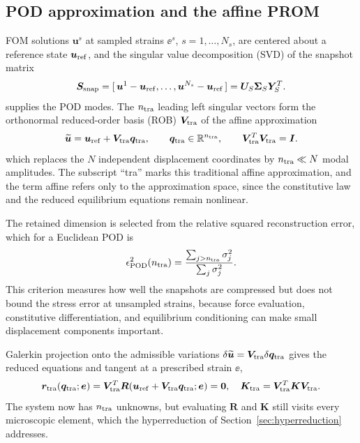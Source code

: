 \subsection{POD approximation and the affine PROM}
FOM solutions $\bm u^s$ at sampled strains $\ee^s$, $s=1,\ldots,N_s$, are centered about a reference state $\bm u_{\rm ref}$, and the singular value decomposition (SVD) of the snapshot matrix
\begin{equation}
 \bm S_{\rm snap}=
 [\,\bm u^1-\bm u_{\rm ref},\ldots,\bm u^{N_s}-\bm u_{\rm ref}\,]
 =\bm U_S\bm\Sigma_S\bm Y_S^T.
 \label{eq:snapshot_svd}
\end{equation}
supplies the POD modes. The $n_{\rm tra}$ leading left singular vectors form the orthonormal reduced-order basis (ROB) $\bm V_{\rm tra}$ of the affine approximation
\begin{equation}
 \widetilde{\bm u}=\bm u_{\rm ref}+\bm V_{\rm tra}\bm q_{\rm tra},
 \qquad \bm q_{\rm tra}\in\mathbb R^{n_{\rm tra}},
 \qquad \bm V_{\rm tra}^T\bm V_{\rm tra}=\bm I.
 \label{eq:linear_prom}
\end{equation}
which replaces the $N$ independent displacement coordinates by $n_{\rm tra}\ll N$ modal amplitudes. The subscript ``tra'' marks this traditional affine approximation, and the term affine refers only to the approximation space, since the constitutive law and the reduced equilibrium equations remain nonlinear.

The retained dimension is selected from the relative squared reconstruction error, which for a Euclidean POD is
\begin{equation}
 \epsilon_{\rm POD}^2(n_{\rm tra})=
 \frac{\sum_{j>n_{\rm tra}}\sigma_j^2}{\sum_j\sigma_j^2}.
 \label{eq:pod_tail}
\end{equation}
This criterion measures how well the snapshots are compressed but does not bound the stress error at unsampled strains, because force evaluation, constitutive differentiation, and equilibrium conditioning can make small displacement components important.

Galerkin projection onto the admissible variations $\delta\widetilde{\bm u}=\bm V_{\rm tra}\delta\bm q_{\rm tra}$ gives the reduced equations and tangent at a prescribed strain $\ee$,
\begin{equation}
 \bm r_{\rm tra}(\bm q_{\rm tra};\bm e)
 =\bm V_{\rm tra}^T
  \bm R(\bm u_{\rm ref}+\bm V_{\rm tra}\bm q_{\rm tra};\bm e)=\bm0,
 \quad
 \bm K_{\rm tra}=\bm V_{\rm tra}^T\bm K\bm V_{\rm tra}.
 \label{eq:linear_galerkin}
\end{equation}
The system now has $n_{\rm tra}$ unknowns, but evaluating $\bm R$ and $\bm K$ still visits every microscopic element, which the hyperreduction of Section~\ref{sec:hyperreduction} addresses.

